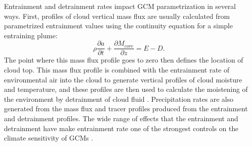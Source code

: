 \documentclass[12pt]{article}
\begin{document}
Entrainment and detrainment rates impact GCM parametrization in several ways.
First, profiles of cloud vertical mass flux are usually calculated from 
parametrized entrainment values using the continuity equation for a 
simple entraining plume:
\begin{equation}
   \label{eq:continuity}
   \rho \frac{\partial a}{\partial t} 
   + \frac{\partial M_{core}}{\partial z} = E - D.
\end{equation}
The point where this mass flux profile goes to zero then defines the location 
of cloud top.  This mass flux profile is combined with the entrainment rate 
of environmental air into the cloud to generate vertical profiles of cloud
moisture and temperature, and these profiles are then used to calculate the
moistening of the environment by detrainment of cloud fluid 
\citep{Tiedtke1989, Kain1990}.  Precipitation rates are also generated from the
mass flux and tracer profiles produced from the entrainment and detrainment
profiles.  The wide range of effects that the entrainment and detrainment have
make entrainment rate one of the strongest controls on the climate sensitivity 
of GCMs \citep{Stainforth2005, Rougier2009}.
\end{document}

